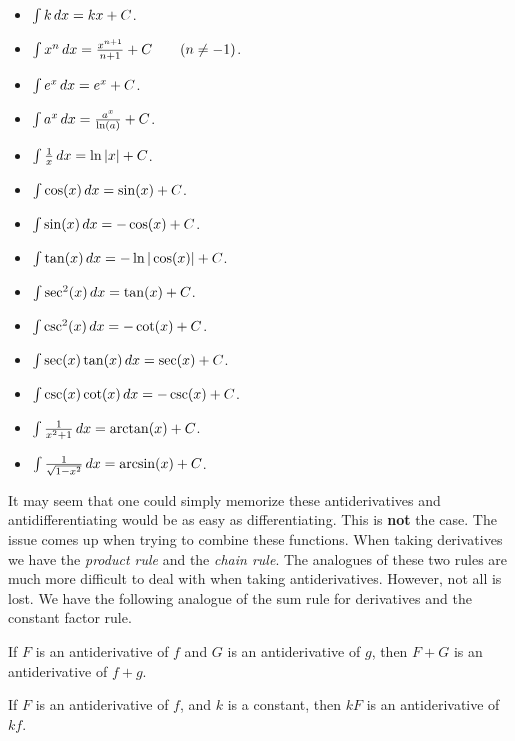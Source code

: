\documentclass{ximera}
\begin{document}
\begin{theorem}\label{theorem:basicAnti} \hfil
\begin{multicols}{3}
\begin{itemize}
\item $\int k \,d x= kx+C$.
\item $\int x^n \,d x= \frac{x^{n+1}}{n+1}+C\qquad(n\ne-1)$.
\item $\int e^x \,d x= e^x + C$.
\item $\int a^x \,d x= \frac{a^x}{\ln(a)}+C$.
\item $\int \frac{1}{x} \,d x= \ln|x|+C$.
\item $\int \cos(x) \,d x = \sin(x) + C$.
\item $\int \sin(x) \,d x = -\cos(x) + C$.  
\item $\int \tan(x) \,d x = -\ln|\cos(x)| + C$.  
\item $\int \sec^2(x) \,d x = \tan(x) + C$. 
\item $\int \csc^2(x) \,d x = -\cot(x) + C$.
\item $\int \sec(x)\tan(x) \,d x = \sec(x) + C$.
\item $\int \csc(x)\cot(x) \,d x = -\csc(x) + C$.
\item $\int \frac{1}{x^2+1}\,d x = \arctan(x) + C$.
\item $\int \frac{1}{\sqrt{1-x^2}}\,d x= \arcsin(x)+C$.
\end{itemize}
\end{multicols}
\end{theorem}

It may seem that one could simply memorize these antiderivatives and
antidifferentiating would be as easy as differentiating. This is
\textbf{not} the case. The issue comes up when trying to combine these
functions.  When taking derivatives we have the \textit{product rule}
and the \textit{chain rule}. The analogues of these two rules are much
more difficult to deal with when taking antiderivatives. However, not
all is lost. We have the following analogue of the sum rule for
derivatives and the constant factor rule.

\begin{theorem}\label{theorem:SRA}
If $F$ is an antiderivative of $f$ and $G$ is an antiderivative of
$g$, then $F+G$ is an antiderivative of $f+g$.
\end{theorem}

\begin{theorem}\label{theorem:CFRA}
If $F$ is an antiderivative of $f$, and $k$ is a constant, then $kF$
is an antiderivative of $kf$.
\end{theorem}
\end{document}
